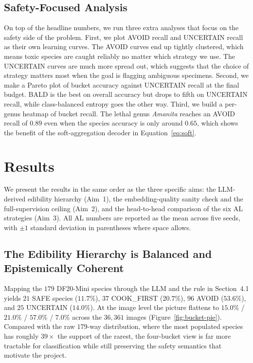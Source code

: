 \documentclass[11pt]{article}
\begin{document}
\subsection{Safety-Focused Analysis}

On top of the headline numbers, we run three extra analyses that focus on
the safety side of the problem. First, we plot AVOID recall and UNCERTAIN
recall as their own learning curves. The AVOID curves end up tightly
clustered, which means toxic species are caught reliably no matter which
strategy we use. The UNCERTAIN curves are much more spread out, which
suggests that the choice of strategy matters most when the goal is flagging
ambiguous specimens. Second, we make a Pareto plot of bucket accuracy
against UNCERTAIN recall at the final budget. BALD is the best on overall
accuracy but drops to fifth on UNCERTAIN recall, while class-balanced
entropy goes the other way. Third, we build a per-genus heatmap of bucket
recall. The lethal genus \emph{Amanita} reaches an AVOID recall of $0.89$
even when the species accuracy is only around $0.65$, which shows the
benefit of the soft-aggregation decoder in Equation~\eqref{eq:soft}.


\section{Results}

We present the results in the same order as the three specific aims:
the LLM-derived edibility hierarchy (Aim~1), the embedding-quality sanity
check and the full-supervision ceiling (Aim~2), and the head-to-head
comparison of the six AL strategies (Aim~3). All AL numbers are reported
as the mean across five seeds, with $\pm 1$ standard deviation in
parentheses where space allows.

\subsection{The Edibility Hierarchy is Balanced and Epistemically Coherent}

Mapping the $179$ DF20-Mini species through the LLM and the rule in
Section~4.1 yields $21$ SAFE species ($11.7\%$), $37$ COOK\_FIRST ($20.7\%$),
$96$ AVOID ($53.6\%$), and $25$ UNCERTAIN ($14.0\%$). At the image level
the picture flattens to $15.0\%$ / $21.0\%$ / $57.0\%$ / $7.0\%$ across the
$36{,}361$ images (Figure~\ref{fig:bucket-pie}). Compared with the raw
$179$-way distribution, where the most populated species has roughly $39\times$
the support of the rarest, the four-bucket view is far more tractable for
classification while still preserving the safety semantics that motivate the
project.
\end{document}
